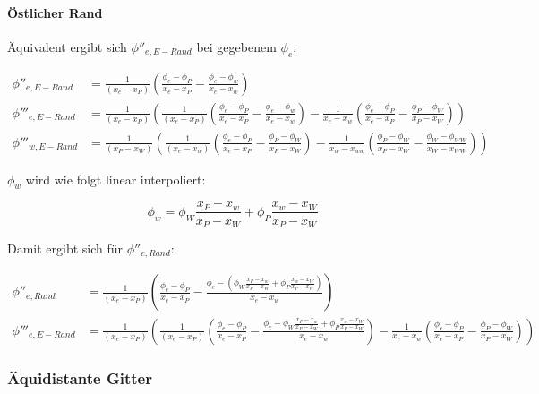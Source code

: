 \documentclass[11pt, ngerman,colorback,accentcolor=tud2d]{tudreport}
\begin{document}
\paragraph{Östlicher Rand}
Äquivalent ergibt sich $\phi''_{e, E-Rand}$ bei gegebenem $\phi_e$:

\begin{align*}
  \phi''_{e, E-Rand} &= \frac{1}{(x_e-x_P)}\left({
\frac{\phi_{e}-\phi_P}{x_{e}-x_P}-\frac{\phi_e-\phi_w}{x_e-x_w}}\right)
\\
  \phi'''_{e, E-Rand} &= \frac{1}{(x_e-x_P)} \left({
  \frac{1}{(x_e-x_P)} \left({
    \frac{\phi_e-\phi_P}{x_e-x_P} - \frac{\phi_e-\phi_w}{x_e-x_w}
    }\right) -
  \frac{1}{x_e-x_w} \left({
    \frac{\phi_e-\phi_P}{x_e-x_P} - \frac{\phi_P-\phi_W}{x_P-x_W}
    }\right)
  }\right)
  \\
  \phi'''_{w, E-Rand} &= \frac{1}{(x_P-x_W)} \left({
  \frac{1}{(x_e-x_w)} \left({
      \frac{\phi_e-\phi_P}{x_e-x_P} - \frac{\phi_P-\phi_W}{x_P-x_W}
    }\right) -
    \frac{1}{x_w-x_{ww}} \left({
        \frac{\phi_P-\phi_W}{x_P-x_W} - \frac{\phi_W-\phi_{WW}}{x_W-x_{WW}}
    }\right)
  }\right)
\end{align*}

$\phi_w$ wird wie folgt linear interpoliert:

\begin{equation*}
  \phi_w = \phi_W \frac{x_P-x_w}{x_P-x_W} + \phi_P \frac{x_w-x_W}{x_P-x_W}
\end{equation*}

Damit ergibt sich für $\phi''_{e,Rand}$:

\begin{align}
  \phi''_{e,Rand} &= \frac{1}{(x_e-x_P)}\left({
\frac{\phi_{e}-\phi_P}{x_{e}-x_P}-\frac{\phi_e-
  \left({
   \phi_W \frac{x_P-x_w}{x_P-x_W} + \phi_P \frac{x_w-x_W}{x_P-x_W}
  }\right)
}{x_e-x_w}}\right)
\\
  \phi'''_{e, E-Rand} &= \frac{1}{(x_e-x_P)} \left({
  \frac{1}{(x_e-x_P)} \left({
    \frac{\phi_e-\phi_P}{x_e-x_P} - \frac{\phi_e- \phi_W \frac{x_P-x_w}{x_P-x_W} + \phi_P \frac{x_w-x_W}{x_P-x_W}
}{x_e-x_w}
    }\right) -
  \frac{1}{x_e-x_w} \left({
    \frac{\phi_e-\phi_P}{x_e-x_P} - \frac{\phi_P-\phi_W}{x_P-x_W}
    }\right)
  }\right)
\end{align}


\subsubsection{Äquidistante Gitter}
\end{document}
